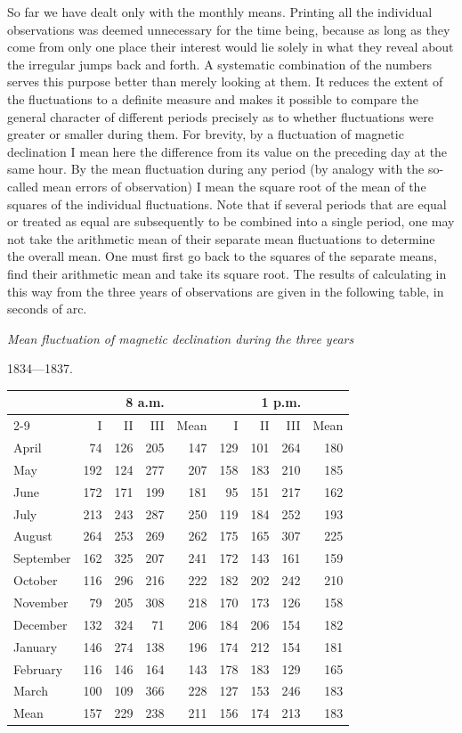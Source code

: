 So far we have dealt only with the monthly means. Printing all the individual observations was deemed unnecessary for the time being, because as long as they come from only one place their interest would lie solely in what they reveal about the irregular jumps back and forth. A systematic combination of the numbers serves this purpose better than merely looking at them. It reduces the extent of the fluctuations to a definite measure and makes it possible to compare the general character of different periods precisely as to whether fluctuations were greater or smaller during them. For brevity, by a fluctuation of magnetic declination I mean here the difference from its value on the preceding day at the same hour. By the mean fluctuation during any period (by analogy with the so-called mean errors of observation) I mean the square root of the mean of the squares of the individual fluctuations. Note that if several periods that are equal or treated as equal are subsequently to be combined into a single period, one may not take the arithmetic mean of their separate mean fluctuations to determine the overall mean. One must first go back to the squares of the separate means, find their arithmetic mean and take its square root. The results of calculating in this way from the three years of
observations are given in the following table, in seconds of arc.
\begin{center}\small
\textit{Mean fluctuation of magnetic declination during the three years}\par
1834---1837.\par\smallskip
\begin{tabular}{l|r|r|r||r||r|r|r||r}
&\multicolumn{4}{c||}{8 a.m.}&\multicolumn{4}{c}{1 p.m.}\\\cline{2-9}
&I&II&III&Mean&I&II&III&Mean\\\hline
April&74&126&205&147&129&101&264&180\\
May&192&124&277&207&158&183&210&185\\
June&172&171&199&181&95&151&217&162\\
July&213&243&287&250&119&184&252&193\\
August&264&253&269&262&175&165&307&225\\
September&162&325&207&241&172&143&161&159\\
October&116&296&216&222&182&202&242&210\\
November&79&205&308&218&170&173&126&158\\
December&132&324&71&206&184&206&154&182\\
January&146&274&138&196&174&212&154&181\\
February&116&146&164&143&178&183&129&165\\
March&100&109&366&228&127&153&246&183\\\hline
Mean&157&229&238&211&156&174&213&183
\end{tabular}
\end{center}

